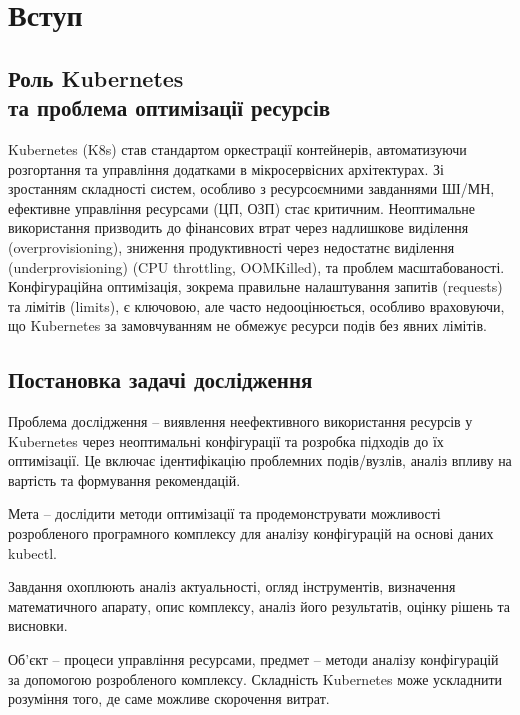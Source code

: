\chapter*{Вступ}

\section*{Роль Kubernetes \\та проблема оптимізації ресурсів}

Kubernetes (K8s) став стандартом оркестрації контейнерів, автоматизуючи розгортання та управління додатками в мікросервісних архітектурах. Зі зростанням складності систем, особливо з ресурсоємними завданнями ШІ/МН, ефективне управління ресурсами (ЦП, ОЗП) стає критичним. Неоптимальне використання призводить до фінансових втрат через надлишкове виділення (overprovisioning), зниження продуктивності через недостатнє виділення (underprovisioning) (CPU throttling, OOMKilled), та проблем масштабованості. Конфігураційна оптимізація, зокрема правильне налаштування запитів (requests) та лімітів (limits), є ключовою, але часто недооцінюється, особливо враховуючи, що Kubernetes за замовчуванням не обмежує ресурси подів без явних лімітів.

\section*{Постановка задачі дослідження}

Проблема дослідження – виявлення неефективного використання ресурсів у Kubernetes через неоптимальні конфігурації та розробка підходів до їх оптимізації. Це включає ідентифікацію проблемних подів/вузлів, аналіз впливу на вартість та формування рекомендацій.

Мета – дослідити методи оптимізації та продемонструвати можливості розробленого програмного комплексу для аналізу конфігурацій на основі даних kubectl.

Завдання охоплюють аналіз актуальності, огляд інструментів, визначення математичного апарату, опис комплексу, аналіз його результатів, оцінку рішень та висновки.

Об'єкт – процеси управління ресурсами, предмет – методи аналізу конфігурацій за допомогою розробленого комплексу. Складність Kubernetes може ускладнити розуміння того, де саме можливе скорочення витрат.